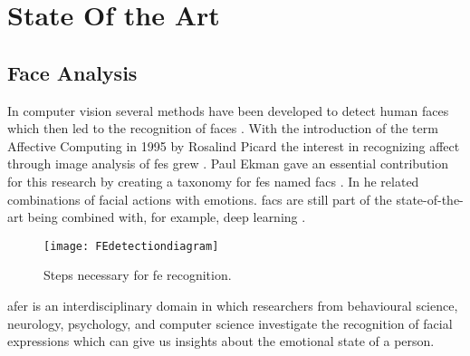 \chapter{State Of the Art}
\label{cha:stateofart}
\acresetall


\section{Face Analysis}

In computer vision several methods have been developed to detect human faces  which then led to the recognition of faces . With the introduction of the term Affective Computing in 1995 by Rosalind Picard the interest in recognizing affect through image analysis of \glspl{fe} grew \cite{Huang2010}. Paul Ekman gave an essential contribution for this research by creating a taxonomy for \glspl{fe} named \gls{facs} \cite{Ekman1977}. In \cite{Ekman1997} he related combinations of facial actions with emotions. \gls{facs} are still part of the state-of-the-art being combined with, for example, deep learning \cite{Jaiswal2016}.


\begin{figure}
    \centering
    \texttt{[image: FEdetectiondiagram]}
    \caption{Steps necessary for \gls{fe} recognition.}
    \label{fig:FEdiagram}
\end{figure}



\gls{afer} is an interdisciplinary domain in which researchers from behavioural science, neurology, psychology, and computer science investigate the recognition of facial expressions which can give us insights about the emotional state of a person.

